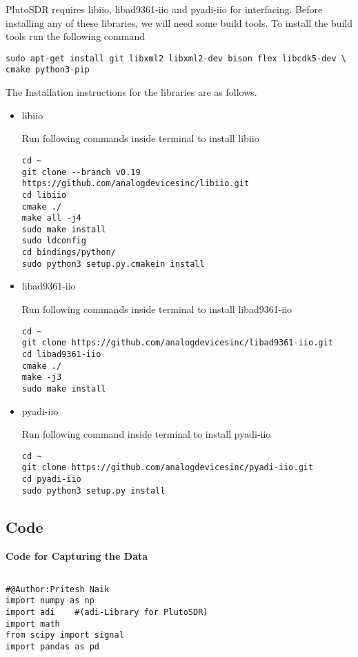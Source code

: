 \begin{appendices}
  \noindent PlutoSDR requires libiio, libad9361-iio and  pyadi-iio for interfacing.
  Before installing any of these libraries, we will need some build tools. To install the build tools run the following command
  \begin{verbatim}
sudo apt-get install git libxml2 libxml2-dev bison flex libcdk5-dev \
cmake python3-pip
  \end{verbatim}
  The Installation  instructions for the libraries are as follows.
  \begin{itemize}
    \item libiio

      Run following commands inside terminal to install libiio
      \begin{verbatim}
cd ~
git clone --branch v0.19 https://github.com/analogdevicesinc/libiio.git
cd libiio
cmake ./
make all -j4
sudo make install
sudo ldconfig
cd bindings/python/
sudo python3 setup.py.cmakein install

        \end{verbatim}
        
        \item   libad9361-iio

      Run following commands inside terminal to install libad9361-iio
      \begin{verbatim}
cd ~
git clone https://github.com/analogdevicesinc/libad9361-iio.git
cd libad9361-iio
cmake ./
make -j3
sudo make install
      \end{verbatim}
      \item pyadi-iio


        Run following command inside terminal to install pyadi-iio
        \begin{verbatim}
cd ~
git clone https://github.com/analogdevicesinc/pyadi-iio.git
cd pyadi-iio
sudo python3 setup.py install
        \end{verbatim}

  \end{itemize}

  \newpage
  \subsection{Code}
  \textbf{Code for Capturing the Data}
  \begin{verbatim}

#@Author:Pritesh Naik
import numpy as np   
import adi    #(adi-Library for PlutoSDR) 
import math     
from scipy import signal
import pandas as pd
 

\end{verbatim}
\end{appendices}
